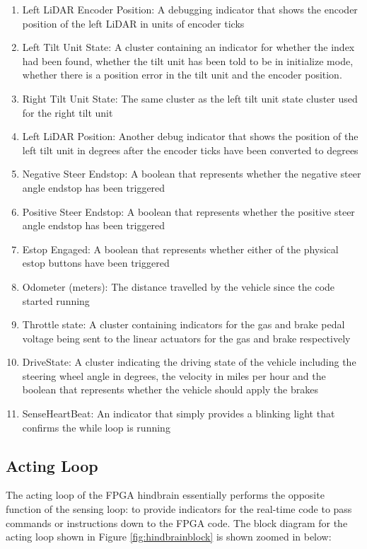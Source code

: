 \begin{enumerate}
\item Left LiDAR Encoder Position: A debugging indicator that shows the encoder position of the left LiDAR in units of encoder ticks
\item Left Tilt Unit State: A cluster containing an indicator for whether the index had been found, whether the tilt unit has been told to be in initialize mode, whether there is a position error in the tilt unit and the encoder position.
\item Right Tilt Unit State: The same cluster as the left tilt unit state cluster used for the right tilt unit
\item Left LiDAR Position: Another debug indicator that shows the position of the left tilt unit in degrees after the encoder ticks have been converted to degrees
\item Negative Steer Endstop: A boolean that represents whether the negative steer angle endstop has been triggered
\item Positive Steer Endstop: A boolean that represents whether the positive steer angle endstop has been triggered
\item Estop Engaged: A boolean that represents whether either of the physical estop buttons have been triggered
\item Odometer (meters): The distance travelled by the vehicle since the code started running
\item Throttle state: A cluster containing indicators for the gas and brake pedal voltage being sent to the linear actuators for the gas and brake respectively
\item DriveState: A cluster indicating the driving state of the vehicle including the steering wheel angle in degrees, the velocity in miles per  hour and the boolean that represents whether the vehicle should apply the brakes
\item SenseHeartBeat: An indicator that simply provides a blinking light that confirms the while loop is running 
\end{enumerate}

\subsection{Acting Loop}

The acting loop of the FPGA hindbrain essentially performs the opposite function of the sensing loop: to provide indicators for the real-time code to pass commands or instructions down to the FPGA code. The block diagram for the acting loop shown in Figure \ref{fig:hindbrainblock} is shown zoomed in below:

